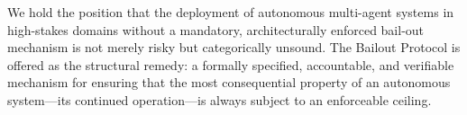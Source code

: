 We hold the position that the deployment of autonomous multi-agent systems in high-stakes domains without a mandatory, architecturally enforced bail-out mechanism is not merely risky but categorically unsound. The Bailout Protocol is offered as the structural remedy: a formally specified, accountable, and verifiable mechanism for ensuring that the most consequential property of an autonomous system—its continued operation—is always subject to an enforceable ceiling.